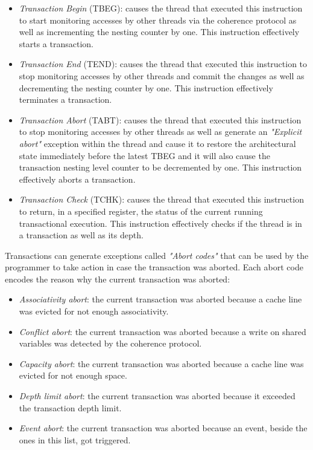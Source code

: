 \documentclass{article}
\begin{document}
            \begin{itemize}

                \item \textit{Transaction Begin} (TBEG): causes the thread that executed this instruction to start monitoring accesses by other threads via the coherence protocol as well as incrementing the nesting counter by one. This instruction effectively starts a transaction.
                \item \textit{Transaction End} (TEND): causes the thread that executed this instruction to stop monitoring accesses by other threads and commit the changes as well as decrementing the nesting counter by one. This instruction effectively terminates a transaction.
                \item \textit{Transaction Abort} (TABT): causes the thread that executed this instruction to stop monitoring accesses by other threads as well as generate an \textit{"Explicit abort"} exception within the thread and cause it to restore the architectural state immediately before the latest TBEG and it will also cause the transaction nesting level counter to be decremented by one. This instruction effectively aborts a transaction.
                \item \textit{Transaction Check} (TCHK): causes the thread that executed this instruction to return, in a specified register, the status of the current running transactional execution. This instruction effectively checks if the thread is in a transaction as well as its depth.

            \end{itemize}

            Transactions can generate exceptions called \textit{"Abort codes"} that can be used by the programmer to take action in case the transaction was aborted. Each abort code encodes the reason why the current transaction was aborted:

            \begin{itemize}

                \item \textit{Associativity abort}: the current transaction was aborted because a cache line was evicted for not enough associativity.
                \item \textit{Conflict abort}: the current transaction was aborted because a write on shared variables was detected by the coherence protocol.
                \item \textit{Capacity abort}: the current transaction was aborted because a cache line was evicted for not enough space.
                \item \textit{Depth limit abort}: the current transaction was aborted because it exceeded the transaction depth limit.
                \item \textit{Event abort}: the current transaction was aborted because an event, beside the ones in this list, got triggered.

            \end{itemize}
\end{document}
